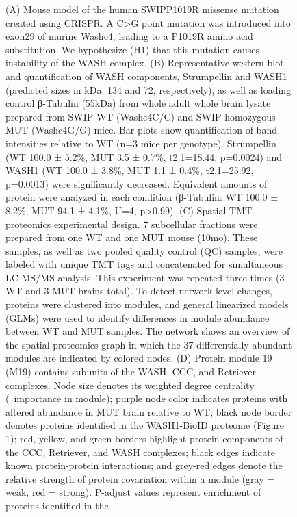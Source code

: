 \begin{figure}[!ht]
	\begin{fullwidth}
	\begin{center}
	\captionsetup{labelformat=adja-page}
	\ContinuedFloat
	\caption{
		(A) Mouse model of the human SWIPP1019R missense mutation created using CRISPR.
		A C>G point mutation was introduced into exon29 of murine Washc4, leading to a
		P1019R amino acid substitution. We hypothesize (H1) that this mutation causes
		instability of the WASH complex.  
		(B) Representative western blot and quantification of WASH components,
		Strumpellin and WASH1 (predicted sizes in kDa: 134 and 72, respectively), as
		well as loading control β-Tubulin (55kDa) from whole adult whole brain lysate
		prepared from SWIP WT (Washc4C/C) and SWIP homozygous MUT (Washc4G/G) mice.  Bar
		plots show quantification of band intensities relative to WT (n=3 mice per
		genotype). Strumpellin (WT 100.0 ± 5.2\%, MUT 3.5 ± 0.7\%, t2.1=18.44, p=0.0024)
		and WASH1 (WT 100.0 ± 3.8\%, MUT 1.1 ± 0.4\%, t2.1=25.92, p=0.0013) were
		significantly decreased. Equivalent amounts of protein were analyzed in each
		condition (β-Tubulin: WT 100.0 ± 8.2\%, MUT 94.1 ± 4.1\%, U=4, p>0.99). 
		(C) Spatial TMT proteomics experimental design. 7 subcellular fractions were
		prepared from one WT and one MUT mouse (10mo). These samples, as well as two
		pooled quality control (QC) samples, were labeled with unique TMT tags and
		concatenated for simultaneous LC-MS/MS analysis. This experiment was repeated
		three times (3 WT and 3 MUT brains total). To detect network-level changes,
		proteins were clustered into modules, and general linearized models (GLMs) were
		used to identify differences in module abundance between WT and MUT samples. The
		network shows an overview of the spatial proteomics graph in which the 37
		differentially abundant modules are indicated by colored nodes. 
		(D) Protein module 19 (M19) contains subunits of the WASH, CCC, and Retriever
		complexes. Node size denotes its weighted degree centrality (~importance in
		module); purple node color indicates proteins with altered abundance in MUT
		brain relative to WT; black node border denotes proteins identified in the
		WASH1-BioID proteome (Figure 1); red, yellow, and green borders highlight
		protein components of the CCC, Retriever, and WASH complexes; black edges
		indicate known protein-protein interactions; and grey-red edges denote the
		relative strength of protein covariation within a module (gray = weak, red =
		strong). P-adjust values represent enrichment of proteins identified in the
}
\end{center}
\end{fullwidth}
\end{figure}
